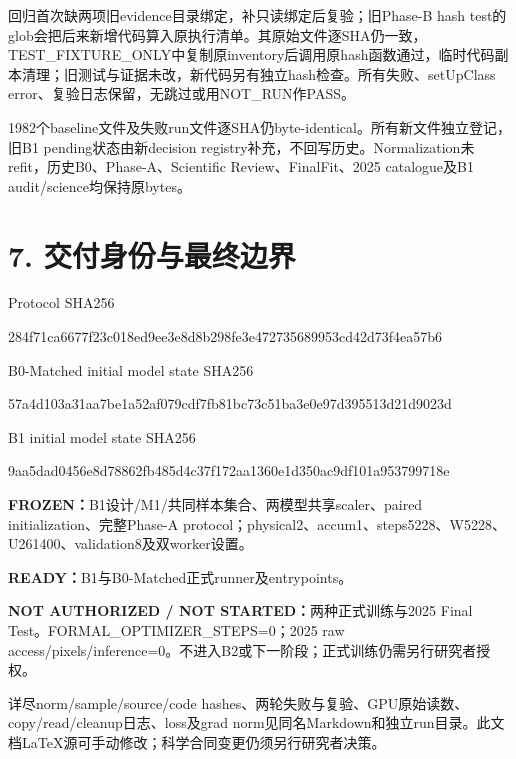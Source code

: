 \documentclass[10pt,a4paper,fontset=windows]{ctexart}
\begin{document}
回归首次缺两项旧evidence目录绑定，补只读绑定后复验；旧Phase-B hash test的glob会把后来新增代码算入原执行清单。其原始文件逐SHA仍一致，TEST\_FIXTURE\_ONLY中复制原inventory后调用原hash函数通过，临时代码副本清理；旧测试与证据未改，新代码另有独立hash检查。所有失败、setUpClass error、复验日志保留，无跳过或用NOT\_RUN作PASS。

1982个baseline文件及失败run文件逐SHA仍byte-identical。所有新文件独立登记，旧B1 pending状态由新decision registry补充，不回写历史。Normalization未refit，历史B0、Phase-A、Scientific Review、FinalFit、2025 catalogue及B1 audit/science均保持原bytes。
\section*{7. 交付身份与最终边界}
\noindent Protocol SHA256\par{\small\ttfamily 284f71ca6677f23c018ed9ee3e8d8b298fe3e472735689953cd42d73f4ea57b6}\par
\noindent B0-Matched initial model state SHA256\par{\small\ttfamily 57a4d103a31aa7be1a52af079cdf7fb81bc73c51ba3e0e97d395513d21d9023d}\par
\noindent B1 initial model state SHA256\par{\small\ttfamily 9aa5dad0456e8d78862fb485d4c37f172aa1360e1d350ac9df101a953799718e}\par
\textbf{FROZEN：}B1设计/M1/共同样本集合、两模型共享scaler、paired initialization、完整Phase-A protocol；physical2、accum1、steps5228、W5228、U261400、validation8及双worker设置。

\textbf{READY：}B1与B0-Matched正式runner及entrypoints。

\textbf{NOT AUTHORIZED / NOT STARTED：}两种正式训练与2025 Final Test。FORMAL\_OPTIMIZER\_STEPS=0；2025 raw access/pixels/inference=0。不进入B2或下一阶段；正式训练仍需另行研究者授权。

详尽norm/sample/source/code hashes、两轮失败与复验、GPU原始读数、copy/read/cleanup日志、loss及grad norm见同名Markdown和独立run目录。此文档LaTeX源可手动修改；科学合同变更仍须另行研究者决策。
\end{document}
